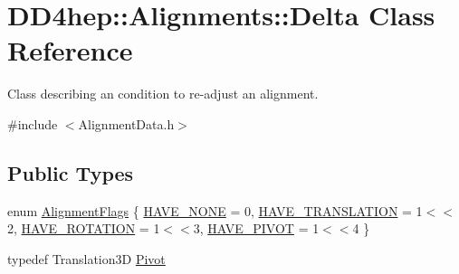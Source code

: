 \hypertarget{class_d_d4hep_1_1_alignments_1_1_delta}{
\section{DD4hep::Alignments::Delta Class Reference}
\label{class_d_d4hep_1_1_alignments_1_1_delta}
}


Class describing an condition to re-\/adjust an alignment.  


{\ttfamily \#include $<$AlignmentData.h$>$}\subsection*{Public Types}
\begin{DoxyCompactItemize}
\item 
enum \hyperlink{class_d_d4hep_1_1_alignments_1_1_delta_ab10dd6760463baa51d8b585aaa4c70aa}{AlignmentFlags} \{ \hyperlink{class_d_d4hep_1_1_alignments_1_1_delta_ab10dd6760463baa51d8b585aaa4c70aaadcf1a03f3ac4ff2143e681c760133e4b}{HAVE\_\-NONE} =  0, 
\hyperlink{class_d_d4hep_1_1_alignments_1_1_delta_ab10dd6760463baa51d8b585aaa4c70aaa709ec8fdc3ef1322d009d78a787775bf}{HAVE\_\-TRANSLATION} =  1$<$$<$2, 
\hyperlink{class_d_d4hep_1_1_alignments_1_1_delta_ab10dd6760463baa51d8b585aaa4c70aaa79ecddccc03ca432d87a65be9ff4e54e}{HAVE\_\-ROTATION} =  1$<$$<$3, 
\hyperlink{class_d_d4hep_1_1_alignments_1_1_delta_ab10dd6760463baa51d8b585aaa4c70aaad7e7bc1c957ff212a4bfcade0e1647b9}{HAVE\_\-PIVOT} =  1$<$$<$4
 \}
\item 
typedef Translation3D \hyperlink{class_d_d4hep_1_1_alignments_1_1_delta_a9ff8cc825f916a4ae84f1780c11f2519}{Pivot}
\end{DoxyCompactItemize}
